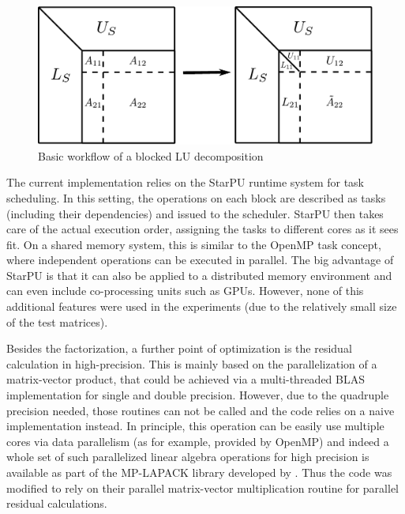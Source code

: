 \begin{figure}[h]
    \centering
    \includegraphics[width=0.9\linewidth]{chapters/5_experiments/figures/block_LU.pdf}
    \caption[Block LU]{Basic workflow of a blocked LU decomposition}
    \label{fig:block_lu}
\end{figure}

The current implementation relies on the StarPU runtime system \cite{augonnet_starpu_2011} for task scheduling. In this setting, the operations on each block are described as tasks (including their dependencies) and issued to the scheduler. StarPU then takes care of the actual execution order, assigning the tasks to different cores as it sees fit. On a shared memory system, this is similar to the OpenMP task concept, where independent operations can be executed in parallel. The big advantage of StarPU is that it can also be applied to a distributed memory environment and can even include co-processing units such as GPUs. However, none of this additional features were used in the experiments (due to the relatively small size of the test matrices). 

Besides the factorization, a further point of optimization is the residual calculation in high-precision. This is mainly based on the parallelization of a matrix-vector product, that could be achieved via a multi-threaded BLAS implementation for single and double precision. However, due to the quadruple precision needed, those routines can not be called and the code relies on a naive implementation instead. In principle, this operation can be easily use multiple cores via data parallelism (as for example, provided by OpenMP) and indeed a whole set of such parallelized linear algebra operations for high precision is available as part of the MP-LAPACK library developed by \cite{nakata_mplapack_2021}. Thus the code was modified to rely on their parallel matrix-vector multiplication routine for parallel residual calculations.


